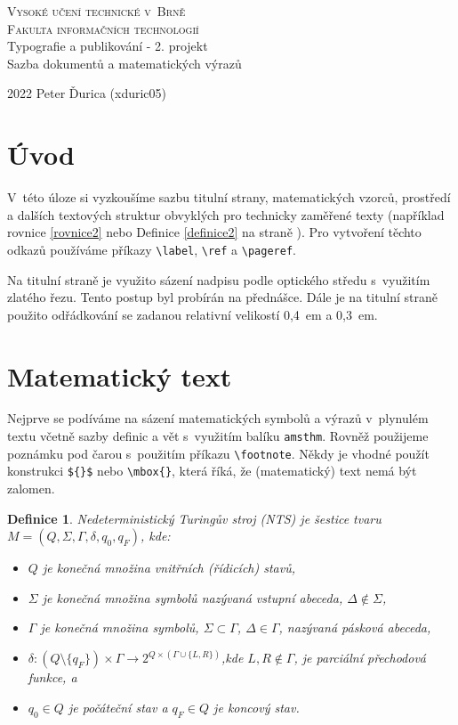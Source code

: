\documentclass[11pt, a4paper, twocolumn]{article}
\newtheorem{definice}{Definice}
\begin{document}
\onecolumn
\begin{center}
\Huge
\textsc{Vysoké učení technické v~Brně}\\
\huge
\textsc{Fakulta informačních technologií}\\
\LARGE Typografie a publikování - 2. projekt\\
Sazba dokumentů a matematických výrazů
\end{center}
{\LARGE 2022 \hfill
Peter Ďurica (xduric05)}
\thispagestyle{empty}
\twocolumn
\clearpage
\setcounter{page}{1}
\section*{Úvod}

V~této úloze si vyzkoušíme sazbu titulní strany, matematických vzorců, prostředí a dalších textových struktur obvyklých pro technicky zaměřené texty (například rovnice \eqref{rovnice2} nebo Definice \ref{definice2} na straně \pageref{definice2}). Pro vytvoření těchto odkazů používáme příkazy \verb|\label|, \verb|\ref| a \verb|\pageref|.

Na titulní straně je využito sázení nadpisu podle optického středu s~využitím zlatého řezu. Tento postup byl probírán na přednášce. Dále je na titulní straně použito odřádkování se zadanou relativní velikostí 0,4~em a 0,3~em.


\section{Matematický text}

Nejprve se podíváme na sázení matematických symbolů a výrazů v~plynulém textu včetně sazby definic a vět s~vy\-užitím balíku \texttt{amsthm}. Rovněž použijeme poznámku pod čarou s~použitím příkazu \verb|\footnote|. Někdy je vhodné použít konstrukci \verb|${}$| nebo \verb|\mbox{}|, která říká, že (matematický) text nemá být zalomen. 
\begin{definice}
\emph{Nedeterministický Turingův stroj} (NTS) je šestice tvaru $M=(Q,\Sigma,\Gamma,\delta,q_0,q_F)$, kde:
\begin{itemize}
\item$Q$ je konečná množina \emph{vnitřních (řídicích) stavů},
\item$\Sigma$ je konečná množina symbolů nazývaná \emph{vstupní abeceda}, $\Delta \notin \Sigma$,
\item$\Gamma$ je konečná množina symbolů, $\Sigma \subset \Gamma$, $\Delta \in \Gamma$, nazývaná \emph{pásková abeceda},
\item$\delta : (Q \setminus \{q_F\}) \times \Gamma \rightarrow 2^{Q\times(\Gamma\cup\{L,R\})}$,kde $L,R \notin \Gamma$, je parciální \emph{přechodová funkce}, a
\item$q_0 \in Q$ je \emph{počáteční stav} a $q_F \in Q$ je \emph{koncový stav}.
\end{itemize}
\end{definice}
\end{document}
